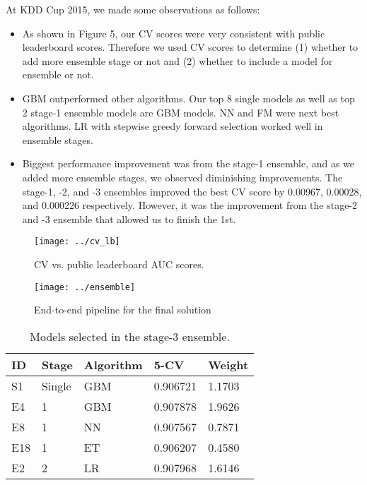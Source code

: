 At KDD Cup 2015, we made some observations as follows:
\begin{itemize}
\setlength\itemsep{0em}
\item As shown in Figure 5, our CV scores were very consistent with public leaderboard scores.  Therefore we used CV scores to determine (1) whether to add more ensemble stage or not and (2) whether to include a model for ensemble or not.
\item GBM outperformed other algorithms.  Our top 8 single models as well as top 2 stage-1 ensemble models are GBM models.  NN and FM were next best algorithms.  LR with stepwise greedy forward selection worked well in ensemble stages.
\item Biggest performance improvement was from the stage-1 ensemble, and as we added more ensemble stages, we observed diminishing improvements.  The stage-1, -2, and -3 ensembles improved the best CV score by 0.00967, 0.00028, and 0.000226 respectively.  However, it was the improvement from the stage-2 and -3 ensemble that allowed us to finish the 1st.
\end{itemize}

\begin{figure}[t]
  \centering
    \texttt{[image: ../cv\_lb]}
      \caption{CV vs. public leaderboard AUC scores.}
\end{figure}

\begin{figure}[!t]
  \centering
    \texttt{[image: ../ensemble]}
      \caption{End-to-end pipeline for the final solution}
\end{figure}

\begin{table}
\begin{center}
	\caption{Models selected in the stage-3 ensemble.}
\begin{tabular}{lllll}
ID 	& Stage 	& Algorithm 	& 5-CV 		& Weight\\ \hline
S1 	& Single	& GBM		& 0.906721 	& 1.1703 \\
E4 	& 1 		& GBM		& 0.907878 	& 1.9626\\
E8 	& 1 		& NN		& 0.907567	& 0.7871\\
E18	& 1		& ET			& 0.906207 	& 0.4580\\
E2	& 2 		& LR			& 0.907968 	& 1.6146\\
\end{tabular}

\label{tb:finalEnsemble}
\end{center}
\end{table}
